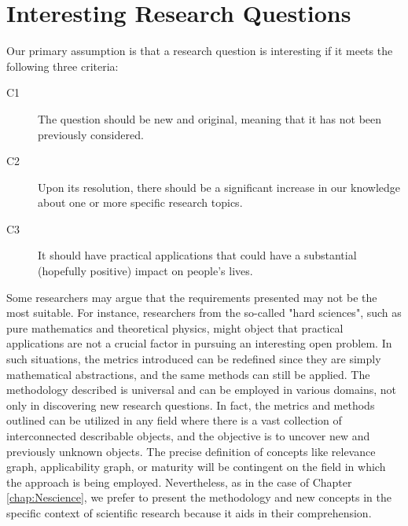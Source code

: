 %
%

\section{Interesting Research Questions}
\label{sec:intro_interesting_questions}

Our primary assumption is that a research question is interesting if it meets the following three criteria:

\bigskip

\begin{description}
\item[C1] The question should be new and original, meaning that it has not been previously considered.
\item[C2] Upon its resolution, there should be a significant increase in our knowledge about one or more specific research topics.
\item[C3] It should have practical applications that could have a substantial (hopefully positive) impact on people's lives.
\end{description}

\bigskip

Some researchers may argue that the requirements presented may not be the most suitable. For instance, researchers from the so-called "hard sciences", such as pure mathematics and theoretical physics, might object that practical applications are not a crucial factor in pursuing an interesting open problem. In such situations, the metrics introduced can be redefined since they are simply mathematical abstractions, and the same methods can still be applied. The methodology described is universal and can be employed in various domains, not only in discovering new research questions. In fact, the metrics and methods outlined can be utilized in any field where there is a vast collection of interconnected describable objects, and the objective is to uncover new and previously unknown objects. The precise definition of concepts like relevance graph, applicability graph, or maturity will be contingent on the field in which the approach is being employed. Nevertheless, as in the case of Chapter \ref{chap:Nescience}, we prefer to present the methodology and new concepts in the specific context of scientific research because it aids in their comprehension.

